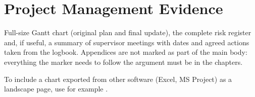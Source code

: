 \chapter{Project Management Evidence}
\label{app:project-management}

\begin{guidance}
Full-size Gantt chart (original plan and final update), the complete risk
register and, if useful, a summary of supervisor meetings with dates and
agreed actions taken from the logbook. Appendices are not marked as part of
the main body: everything the marker needs to follow the argument must be in
the chapters.

To include a chart exported from other software (Excel, MS Project) as a
landscape page, use for example
\verb||.
\end{guidance}

  {}
  {\iffinalmode\else
     \fi}
